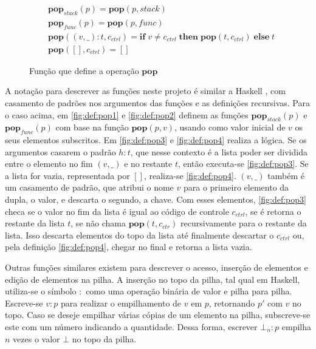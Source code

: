 \begin{figure}[ht]
	\begin{align}
		&\mathbf{pop}_{stack}(p) = \mathbf{pop}(p, stack) \label{fig:def:pop1}\\
		&\mathbf{pop}_{func}(p) = \mathbf{pop}(p, func) \label{fig:def:pop2}\\
		&\mathbf{pop}((v, \_) : t, c_{ctrl}) = \mathbf{if} \; v \neq c_{ctrl} \;\mathbf{then} \; \mathbf{pop}(t, c_{ctrl}) \; \mathbf{else} \; t  \label{fig:def:pop3}\\
		&\mathbf{pop}([], c_{ctrl}) =  [] \label{fig:def:pop4}
	\end{align}
	\caption{Função que define a operação $\mathbf{pop}$}
	\label{fig:def:pop}
\end{figure}

A notação para descrever as funções neste projeto é similar a Haskell \cite{HASKELL}, com casamento de padrões nos argumentos das funções e as definições recursivas. Para o caso acima, em \ref{fig:def:pop1} e \ref{fig:def:pop2} definem as funções $\mathbf{pop}_{stack}(p)$ e $\mathbf{pop}_{func}(p)$ com base na função $\mathbf{pop}(p, v)$, usando como valor inicial de $v$ os seus elementos subscritos. Em \ref{fig:def:pop3} e \ref{fig:def:pop4} realiza a lógica. Se os argumentos casarem o padrão $h : t$, que nesse contexto é a lista poder ser dividida entre o elemento no fim $(v, \_)$ e no restante $t$, então executa-se \ref{fig:def:pop3}. Se a lista for vazia, representada por $[]$, realiza-se \ref{fig:def:pop4}. $(v,\_)$ também é um casamento de padrão, que atribui o nome $v$ para o primeiro elemento da dupla, o valor, e descarta o segundo, a chave. Com esses elementos, \ref{fig:def:pop3} checa se o valor no fim da lista é igual ao código de controle $c_{ctrl}$, se é retorna o restante da lista $t$, se não chama $\mathbf{pop}(t, c_{ctr})$ recursivamente para o restante da lista. Isso descarta elementos do topo da lista até finalmente descartar o $c_{ctrl}$ ou, pela definição \ref{fig:def:pop4}, chegar no final e retorna a lista vazia.

Outras funções similares existem para descrever o acesso, inserção de elementos e edição de elementos na pilha. A inserção no topo da pilha, tal qual em Haskell, utiliza-se o símbolo $:$ como uma operação binária de valor e pilha para pilha. Escreve-se $v : p$ para realizar o empilhamento de $v$ em $p$, retornando $p'$ com $v$ no topo. Caso se deseje empilhar várias cópias de um elemento na pilha, subscreve-se este com um número indicando a quantidade. Dessa forma, escrever $\bot_n : p$ empilha $n$ vezes o valor $\bot$ no topo da pilha. 

